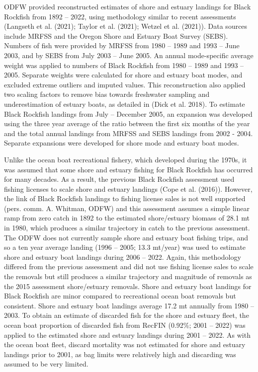 \documentclass[11pt,
  letterpaper,
]{article}
\begin{document}
ODFW provided reconstructed estimates of shore and estuary landings for Black Rockfish from 1892 -- 2022, using methodology similar to recent assessments (Langseth et al. (2021); Taylor et al. (2021); Wetzel et al. (2021)). Data sources include MRFSS and the Oregon Shore and Estuary Boat Survey (SEBS). Numbers of fish were provided by MRFSS from 1980 -- 1989 and 1993 -- June 2003, and by SEBS from July 2003 -- June 2005. An annual mode-specific average weight was applied to numbers of Black Rockfish from 1980 -- 1989 and 1993 -- 2005. Separate weights were calculated for shore and estuary boat modes, and excluded extreme outliers and imputed values. This reconstruction also applied two scaling factors to remove bias towards freshwater sampling and underestimation of estuary boats, as detailed in (Dick et al. 2018). To estimate Black Rockfish landings from July -- December 2005, an expansion was developed using the three year average of the ratio between the first six months of the year and the total annual landings from MRFSS and SEBS landings from 2002 - 2004. Separate expansions were developed for shore mode and estuary boat modes.

Unlike the ocean boat recreational fishery, which developed during the 1970s, it was assumed that some shore and estuary fishing for Black Rockfish has occurred for many decades. As a result, the previous Black Rockfish assessment used fishing licenses to scale shore and estuary landings (Cope et al. (2016)). However, the link of Black Rockfish landings to fishing license sales is not well supported (pers. comm. A. Whitman, ODFW) and this assessment assumes a simple linear ramp from zero catch in 1892 to the estimated shore/estuary biomass of 28.1 mt in 1980, which produces a similar trajectory in catch to the previous assessment. The ODFW does not currently sample shore and estuary boat fishing trips, and so a ten year average landing (1996 -- 2005; 13.3 mt/year) was used to estimate shore and estuary boat landings during 2006 -- 2022. Again, this methodology differed from the previous assessment and did not use fishing license sales to scale the removals but still produces a similar trajectory and magnitude of removals as the 2015 assessment shore/estuary removals. Shore and estuary boat landings for Black Rockfish are minor compared to recreational ocean boat removals but consistent. Shore and estuary boat landings average 17.2 mt annually from 1980 -- 2003. To obtain an estimate of discarded fish for the shore and estuary fleet, the ocean boat proportion of discarded fish from RecFIN (0.92\%; 2001 -- 2022) was applied to the estimated shore and estuary landings during 2001 -- 2022. As with the ocean boat fleet, discard mortality was not estimated for shore and estuary landings prior to 2001, as bag limits were relatively high and discarding was assumed to be very limited.
\end{document}
